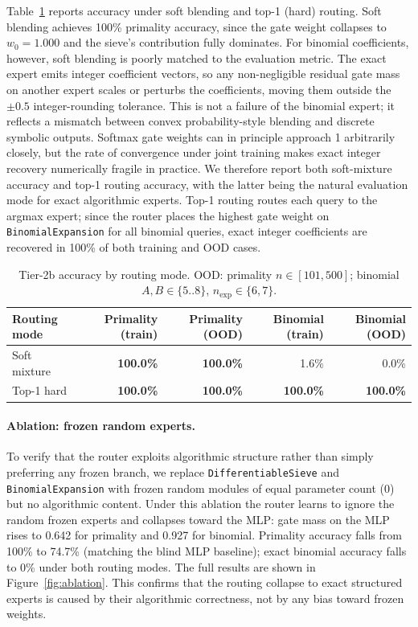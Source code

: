 \documentclass{article}
\begin{document}
Table~\ref{tab:tier2b_acc} reports accuracy under soft blending and top-1 (hard) routing.
Soft blending achieves 100\% primality accuracy, since the gate weight collapses to
$w_0 = 1.000$ and the sieve's contribution fully dominates. For binomial coefficients,
however, soft blending is poorly matched to the evaluation metric.
The exact expert emits integer coefficient vectors, so any non-negligible residual gate
mass on another expert scales or perturbs the coefficients, moving them outside the
$\pm 0.5$ integer-rounding tolerance. This is not a failure of the binomial expert; it
reflects a mismatch between convex probability-style blending and discrete symbolic
outputs. Softmax gate weights can in principle approach 1 arbitrarily closely, but the
rate of convergence under joint training makes exact integer recovery numerically fragile
in practice. We therefore report both soft-mixture accuracy and top-1 routing accuracy,
with the latter being the natural evaluation mode for exact algorithmic experts.
Top-1 routing routes each query to the argmax
expert; since the router places the highest gate weight on \texttt{BinomialExpansion}
for all binomial queries, exact integer coefficients are recovered in 100\% of
both training and OOD cases.

\begin{table}[h]
  \centering
  \caption{Tier-2b accuracy by routing mode. OOD: primality $n \in [101,500]$;
    binomial $A,B \in \{5..8\}$, $n_\text{exp} \in \{6,7\}$.}
  \label{tab:tier2b_acc}
  \small
  \begin{tabular}{lrrrr}
    \toprule
    Routing mode & Primality (train) & Primality (OOD) & Binomial (train) & Binomial (OOD) \\
    \midrule
    Soft mixture  & \textbf{100.0\%} & \textbf{100.0\%} & 1.6\%            & 0.0\%          \\
    Top-1 hard    & \textbf{100.0\%} & \textbf{100.0\%} & \textbf{100.0\%} & \textbf{100.0\%} \\
    \bottomrule
  \end{tabular}
\end{table}

\paragraph{Ablation: frozen random experts.}
To verify that the router exploits algorithmic structure rather than simply preferring
any frozen branch, we replace \texttt{DifferentiableSieve} and
\texttt{BinomialExpansion} with frozen random modules of equal parameter count (0)
but no algorithmic content. Under this ablation the router learns to ignore the random
frozen experts and collapses toward the MLP: gate mass on the MLP rises to 0.642 for
primality and 0.927 for binomial. Primality accuracy falls from 100\% to 74.7\%
(matching the blind MLP baseline); exact binomial accuracy falls to 0\% under both
routing modes. The full results are shown in Figure~\ref{fig:ablation}. This confirms
that the routing collapse to exact structured experts is caused by their algorithmic
correctness, not by any bias toward frozen weights.
\end{document}
